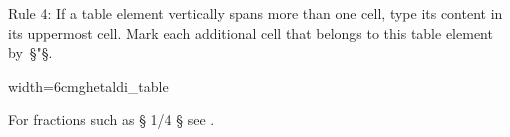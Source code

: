 \begin{mainrule}
Rule 4: If a table element vertically spans more than one cell, type its content in its uppermost cell. 
Mark each additional cell that belongs to this table element by~§"§.
\end{mainrule}

\vspace{3mm}
\begin{sampleImageSmall}{width=6cm}{ghetaldi_table}

\end{sampleImageSmall}

\vspace{-5mm}
\begin{crossref}
For fractions such as §{ 1/4 }§ see .
\end{crossref}


